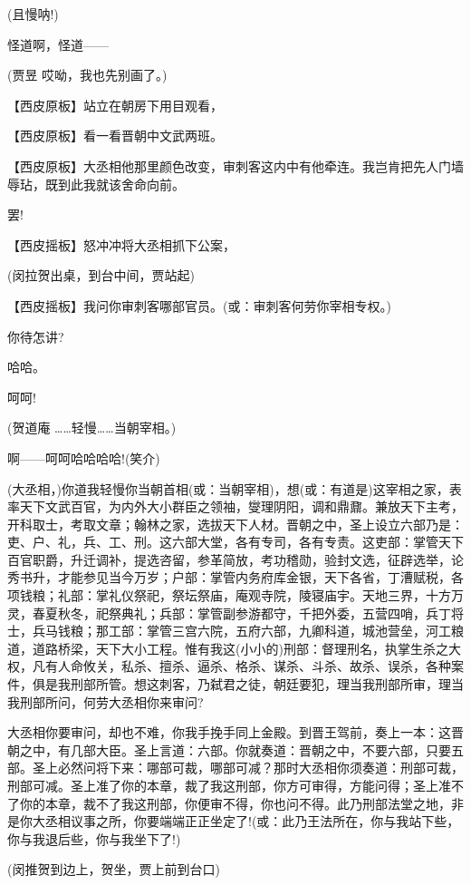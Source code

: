 (且慢呐!)

怪道啊，怪道------

(贾昱 哎呦，我也先别画了。)

【西皮原板】站立在朝房下用目观看，

【西皮原板】看一看晋朝中文武两班。

【西皮原板】大丞相他那里颜色改变，审刺客这内中有他牵连。我岂肯把先人门墙辱玷，既到此我就该舍命向前。

罢!

【西皮摇板】怒冲冲将大丞相抓下公案，

(闵拉贺出桌，到台中间，贾站起)

【西皮摇板】我问你审刺客哪部官员。(或：审刺客何劳你宰相专权。)

你待怎讲?

哈哈。

呵呵!

(贺道庵 \ldots{}\ldots{}轻慢\ldots{}\ldots{}当朝宰相。)

啊------呵呵哈哈哈哈!(笑介)

(大丞相，)你道我轻慢你当朝首相(或：当朝宰相)，想(或：有道是)这宰相之家，表率天下文武百官，为内外大小群臣之领袖，燮理阴阳，调和鼎鼐。兼放天下主考，开科取士，考取文章；翰林之家，选拔天下人材。晋朝之中，圣上设立六部乃是：吏、户、礼，兵、工、刑。这六部大堂，各有专司，各有专责。这吏部：掌管天下百官职爵，升迁调补，提选咨留，参革简放，考功稽勋，验封文选，征辟选举，论秀书升，才能参见当今万岁；户部：掌管内务府库金银，天下各省，丁漕赋税，各项钱粮；礼部：掌礼仪祭祀，祭坛祭庙，庵观寺院，陵寝庙宇。天地三界，十方万灵，春夏秋冬，祀祭典礼；兵部：掌管副参游都守，千把外委，五营四哨，兵丁将士，兵马钱粮；那工部：掌管三宫六院，五府六部，九卿科道，城池营垒，河工粮道，道路桥梁，天下大小工程。惟有我这(小小的)刑部：督理刑名，执掌生杀之大权，凡有人命攸关，私杀、擅杀、逼杀、格杀、谋杀、斗杀、故杀、误杀，各种案件，俱是我刑部所管。想这刺客，乃弑君之徒，朝廷要犯，理当我刑部所审，理当我刑部所问，何劳大丞相你来审问?

大丞相你要审问，却也不难，你我手挽手同上金殿。到晋王驾前，奏上一本：这晋朝之中，有几部大臣。圣上言道：六部。你就奏道：晋朝之中，不要六部，只要五部。圣上必然问将下来：哪部可裁，哪部可减？那时大丞相你须奏道：刑部可裁，刑部可减。圣上准了你的本章，裁了我这刑部，你方可审得，方能问得；圣上准不了你的本章，裁不了我这刑部，你便审不得，你也问不得。此乃刑部法堂之地，非是你大丞相议事之所，你要端端正正坐定了!(或：此乃王法所在，你与我站下些，你与我退后些，你与我坐下了!)

(闵推贺到边上，贺坐，贾上前到台口)

